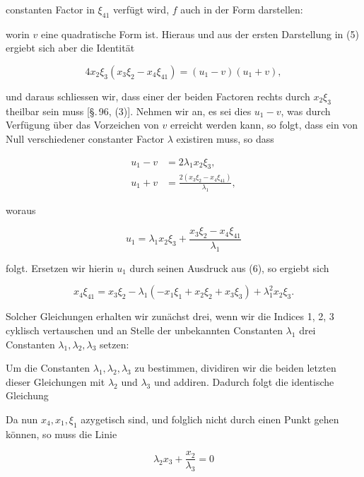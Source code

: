 constanten Factor in $\xi_{41}$ verfügt wird, $f$ auch in der Form darstellen:


worin $v$ eine quadratische Form ist. Hieraus und aus der ersten Darstellung in (5) ergiebt sich aber die Identität

\[
4x_2\xi_3(x_3\xi_2 - x_4\xi_{41}) = (u_1 - v)(u_1 + v),
\]

und daraus schliessen wir, dass einer der beiden Factoren rechts durch $x_2\xi_3$ theilbar sein muss [\S.\,96, (3)]. Nehmen wir an, es sei dies $u_1 - v$, was durch Verfügung über das Vorzeichen von $v$ erreicht werden kann, so folgt, dass ein von Null verschiedener constanter Factor $\lambda$ existiren muss, so dass

\[
\begin{aligned}
u_1 - v &= 2\lambda_1 x_2\xi_3,\\
u_1 + v &= \frac{2(x_3\xi_2 - x_4\xi_{41})}{\lambda_1},
\end{aligned}
\]

woraus

\[
u_1 = \lambda_1 x_2\xi_3 + \frac{x_3\xi_2 - x_4\xi_{41}}{\lambda_1}
\]

folgt. Ersetzen wir hierin $u_1$ durch seinen Ausdruck aus (6), so ergiebt sich

\[
x_4\xi_{41} = x_3\xi_2 - \lambda_1(-x_1\xi_1 + x_2\xi_2 + x_3\xi_3) + \lambda_1^2 x_2\xi_3.
\]

Solcher Gleichungen erhalten wir zunächst drei, wenn wir die Indices 1, 2, 3 cyklisch vertauschen und an Stelle der unbekannten Constanten $\lambda_1$ drei Constanten $\lambda_1, \lambda_2, \lambda_3$ setzen:


Um die Constanten $\lambda_1, \lambda_2, \lambda_3$ zu bestimmen, dividiren wir die beiden letzten dieser Gleichungen mit $\lambda_2$ und $\lambda_3$ und addiren. Dadurch folgt die identische Gleichung


Da nun $x_4, x_1, \xi_1$ azygetisch sind, und folglich nicht durch einen Punkt gehen können, so muss die Linie

\[
\lambda_2 x_3 + \frac{x_2}{\lambda_3} = 0
\]
